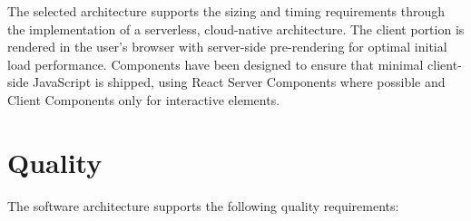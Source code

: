 \documentclass[11pt,a4paper]{article}
\begin{document}
The selected architecture supports the sizing and timing requirements through the implementation of a serverless, cloud-native architecture. The client portion is rendered in the user's browser with server-side pre-rendering for optimal initial load performance. Components have been designed to ensure that minimal client-side JavaScript is shipped, using React Server Components where possible and Client Components only for interactive elements.


\section{Quality}
\label{sec:quality}

The software architecture supports the following quality requirements:
\end{document}
